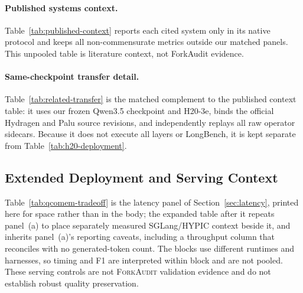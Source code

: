 \documentclass{article}
\newcommand{\method}{\textsc{ForkAudit}}
\begin{document}
\paragraph{Published systems context.}
Table~\ref{tab:published-context} reports each cited system only in its native
protocol and keeps all non-commensurate metrics outside our matched panels.
This unpooled table is literature context, not ForkAudit evidence.


\paragraph{Same-checkpoint transfer detail.}
Table~\ref{tab:related-transfer} is the matched complement to the published
context table: it uses our frozen Qwen3.5 checkpoint and H20-3e, binds the
official Hydragen and Palu source revisions, and independently replays all raw
operator sidecars.  Because it does not execute all layers or LongBench, it is
kept separate from Table~\ref{tab:h20-deployment}.


\subsection{Extended Deployment and Serving Context}
\label{app:illustrative-store}

Table~\ref{tab:qcomem-tradeoff} is the latency panel of
Section~\ref{sec:latency}, printed here for space rather than in the body; the
expanded table after it repeats panel~(a) to place separately measured
SGLang/HYPIC context beside it, and inherits panel~(a)'s reporting caveats,
including a throughput column that reconciles with no generated-token count.
The blocks use different runtimes and harnesses, so timing and F1 are
interpreted within block and are not pooled.  These serving controls are not
\method{} validation evidence and do not establish robust quality preservation.




\end{document}
